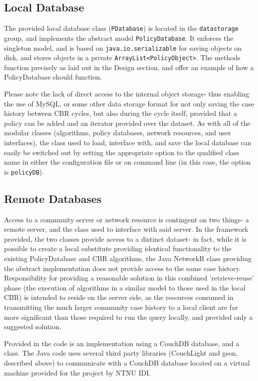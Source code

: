 \subsection{Local Database}
The provided local database class (\texttt{PDatabase}) is located in the \texttt{datastorage} group, and implements the abstract model \texttt{PolicyDatabase}. It enforces the singleton model, and is based on \texttt{java.io.serializable} for saving objects on disk, and stores objects in a private \texttt{ArrayList<PolicyObject>}. The methods function precisely as laid out in the Design section, and offer an example of how a PolicyDatabase should function.

Please note the lack of direct access to the internal object storage- thus enabling the use of MySQL, or some other data storage format for not only saving the case history between CBR cycles, but also during the cycle itself, provided that a policy can be added and an iterator provided over the dataset. As with all of the modular classes (algorithms, policy databases, network resources, and user interfaces), the class used to load, interface with, and save the local database can easily be switched out by setting the appropriate  option to the qualified class name in either the configuration file or on command line (in this case, the option is \texttt{policyDB}).

\subsection{Remote Databases}  %
Access to a community server or network resource is contingent on two things- a remote server, and the class used to interface with said server. In the framework provided, the two classes provide access to a distinct dataset- in fact, while it is possible to create a local substitute providing identical functionality to the existing PolicyDatabase and CBR algorithms, the Java NetworkR class providing the abstract implementation does not provide access to the same case history. Responsibility for providing a reasonable solution in this combined 'retrieve-reuse' phase (the execution of algorithms in a similar model to those used in the local CBR) is intended to reside on the server side, as the resources consumed in transmitting the much larger community case history to a local client are far more significant than those required to run the query locally, and provided only a suggested solution.

Provided in the code is an implementation using a CouchDB database, and a class. The Java code uses several third party libraries (CouchLight and gson, described above) to communicate with a CouchDB database located on a virtual machine provided for the project by NTNU IDI.

